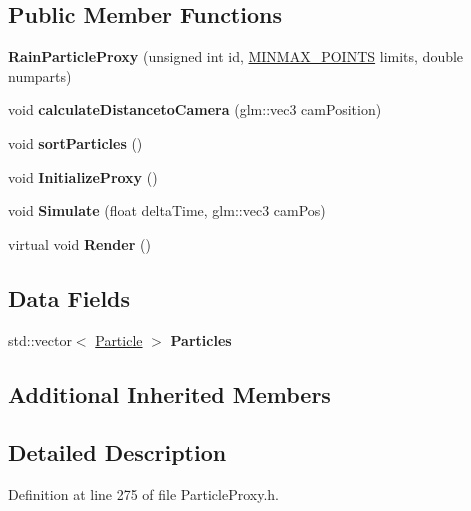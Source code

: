 \subsection*{Public Member Functions}
\begin{DoxyCompactItemize}
\item 
{\bfseries Rain\+Particle\+Proxy} (unsigned int id, \hyperlink{struct_m_i_n_m_a_x___p_o_i_n_t_s}{M\+I\+N\+M\+A\+X\+\_\+\+P\+O\+I\+N\+TS} limits, double numparts)\hypertarget{class_rain_particle_proxy_a4386acd47fb0d9b49f85416287dc02cc}{}\label{class_rain_particle_proxy_a4386acd47fb0d9b49f85416287dc02cc}

\item 
void {\bfseries calculate\+Distanceto\+Camera} (glm\+::vec3 cam\+Position)\hypertarget{class_rain_particle_proxy_accf1a6b7f070ad05331659cf2600e3fa}{}\label{class_rain_particle_proxy_accf1a6b7f070ad05331659cf2600e3fa}

\item 
void {\bfseries sort\+Particles} ()\hypertarget{class_rain_particle_proxy_a430cf877428e7abb1d7977391c44f1b2}{}\label{class_rain_particle_proxy_a430cf877428e7abb1d7977391c44f1b2}

\item 
void {\bfseries Initialize\+Proxy} ()\hypertarget{class_rain_particle_proxy_a5257efbcccb3893755e82546d0665744}{}\label{class_rain_particle_proxy_a5257efbcccb3893755e82546d0665744}

\item 
void {\bfseries Simulate} (float delta\+Time, glm\+::vec3 cam\+Pos)\hypertarget{class_rain_particle_proxy_a4c224073e8aa639032ccf2107622e645}{}\label{class_rain_particle_proxy_a4c224073e8aa639032ccf2107622e645}

\item 
virtual void {\bfseries Render} ()\hypertarget{class_rain_particle_proxy_a77f7f34c12aec5e7166c7a99cc54a060}{}\label{class_rain_particle_proxy_a77f7f34c12aec5e7166c7a99cc54a060}

\end{DoxyCompactItemize}
\subsection*{Data Fields}
\begin{DoxyCompactItemize}
\item 
std\+::vector$<$ \hyperlink{class_particle}{Particle} $>$ {\bfseries Particles}\hypertarget{class_rain_particle_proxy_a2a1ed4f2a64d490055d91ef0f2017a56}{}\label{class_rain_particle_proxy_a2a1ed4f2a64d490055d91ef0f2017a56}

\end{DoxyCompactItemize}
\subsection*{Additional Inherited Members}


\subsection{Detailed Description}


Definition at line 275 of file Particle\+Proxy.\+h.

